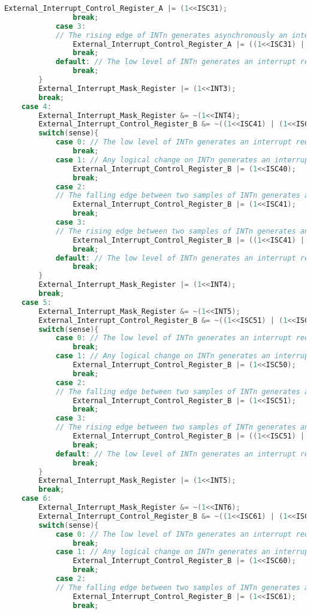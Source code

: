 \begin{lstlisting}[language=C, caption={atmega128interrupt.c}, label=atmega128interrupt-c, captionpos=b]
				External_Interrupt_Control_Register_A |= (1<<ISC31);
				break;
			case 3: 
			// The rising edge of INTn generates asynchronously an interrupt request.
				External_Interrupt_Control_Register_A |= ((1<<ISC31) | (1<<ISC30));
				break;
			default: // The low level of INTn generates an interrupt request.
				break;
		}
		External_Interrupt_Mask_Register |= (1<<INT3);
		break;
	case 4:
		External_Interrupt_Mask_Register &= ~(1<<INT4);
		External_Interrupt_Control_Register_B &= ~((1<<ISC41) | (1<<ISC40));
		switch(sense){
			case 0: // The low level of INTn generates an interrupt request.
				break;
			case 1: // Any logical change on INTn generates an interrupt request
				External_Interrupt_Control_Register_B |= (1<<ISC40);
				break;
			case 2: 
			// The falling edge between two samples of INTn generates an interrupt request.
				External_Interrupt_Control_Register_B |= (1<<ISC41);
				break;
			case 3: 
			// The rising edge between two samples of INTn generates an interrupt request.
				External_Interrupt_Control_Register_B |= ((1<<ISC41) | (1<<ISC40));
				break;
			default: // The low level of INTn generates an interrupt request.
				break;
		}
		External_Interrupt_Mask_Register |= (1<<INT4);
		break;
	case 5:
		External_Interrupt_Mask_Register &= ~(1<<INT5);
		External_Interrupt_Control_Register_B &= ~((1<<ISC51) | (1<<ISC50));
		switch(sense){
			case 0: // The low level of INTn generates an interrupt request.
				break;
			case 1: // Any logical change on INTn generates an interrupt request
				External_Interrupt_Control_Register_B |= (1<<ISC50);
				break;
			case 2: 
			// The falling edge between two samples of INTn generates an interrupt request.
				External_Interrupt_Control_Register_B |= (1<<ISC51);
				break;
			case 3: 
			// The rising edge between two samples of INTn generates an interrupt request.
				External_Interrupt_Control_Register_B |= ((1<<ISC51) | (1<<ISC50));
				break;
			default: // The low level of INTn generates an interrupt request.
				break;
		}
		External_Interrupt_Mask_Register |= (1<<INT5);
		break;
	case 6:
		External_Interrupt_Mask_Register &= ~(1<<INT6);
		External_Interrupt_Control_Register_B &= ~((1<<ISC61) | (1<<ISC60));
		switch(sense){
			case 0: // The low level of INTn generates an interrupt request.
				break;
			case 1: // Any logical change on INTn generates an interrupt request
				External_Interrupt_Control_Register_B |= (1<<ISC60);
				break;
			case 2: 
			// The falling edge between two samples of INTn generates an interrupt request.
				External_Interrupt_Control_Register_B |= (1<<ISC61);
				break;

\end{lstlisting}
